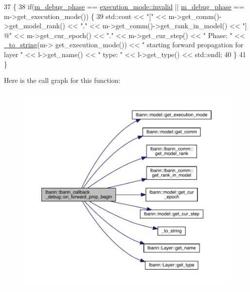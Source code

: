 \begin{DoxyCode}
37                                                                         \{
38   \textcolor{keywordflow}{if}(\hyperlink{classlbann_1_1lbann__callback__debug_acc66ab699534e42aa958148f1fb3fd6f}{m\_debug\_phase} == \hyperlink{base_8hpp_a2781a159088df64ed7d47cc91c4dc0a8afedb2d84cafe20862cb4399751a8a7e3}{execution\_mode::invalid} || 
      \hyperlink{classlbann_1_1lbann__callback__debug_acc66ab699534e42aa958148f1fb3fd6f}{m\_debug\_phase} == m->get\_execution\_mode()) \{
39     std::cout << \textcolor{stringliteral}{"["} << m->get\_comm()->get\_model\_rank() << \textcolor{stringliteral}{"."} << m->get\_comm()->get\_rank\_in\_model() << \textcolor{stringliteral}{"]
       @"} << m->get\_cur\_epoch() << \textcolor{stringliteral}{"."} << m->get\_cur\_step() << \textcolor{stringliteral}{" Phase: "} << \hyperlink{base_8hpp_adeeaddd10bd31df0cae7cb0fcae45d5c}{\_to\_string}(m->
      get\_execution\_mode()) << \textcolor{stringliteral}{" starting forward propagation for layer "} << l->get\_name() << \textcolor{stringliteral}{" type: "} << l->get\_type() << 
      std::endl;
40   \}
41 \}
\end{DoxyCode}
Here is the call graph for this function\+:\nopagebreak
\begin{figure}[H]
\begin{center}
\leavevmode
\includegraphics[width=350pt]{classlbann_1_1lbann__callback__debug_ac3e88ef582a7e3949b6e016ca2b17459_cgraph}
\end{center}
\end{figure}
